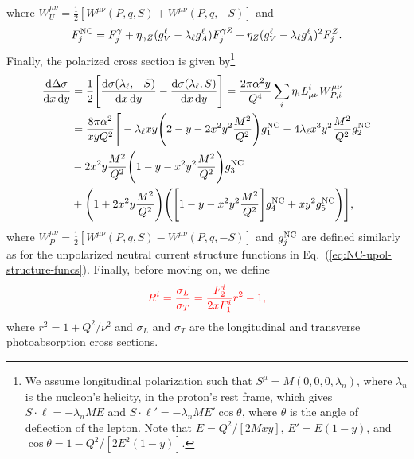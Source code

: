 \documentclass[aps,prd,amsmath,superscriptaddress,floatfix,nofootinbib]{revtex4-2}
\newcommand{\diff}[1]{{\rm d} #1}
\newcommand{\eref}[1]{Eq.~(\ref{eq:#1})}
\begin{document}
where $W^{\mu\nu}_{U} = \frac{1}{2} [ W^{\mu\nu}(P,q,S) + W^{\mu\nu}(P,q,-S) ]$ and 
\begin{eqnarray}
\label{eq:NC-upol-structure-funcs}
    F_{j}^{\rm NC} = F_{j}^{\gamma} + \eta_{\gamma Z} (g_{V}^{\ell} - \lambda_{\ell} g_{A}^{\ell}) F_{j}^{\gamma Z} + \eta_{Z} (g_{V}^{\ell} - \lambda_{\ell} g_{A}^{\ell})^2 F_{j}^{Z}
.\end{eqnarray}
Finally, the polarized cross section is given by\footnote{We assume longitudinal polarization such that $S^{\mu} = M(0,0,0,\lambda_{n})$, where $\lambda_{n}$ is the nucleon's helicity, in the proton's rest frame, which gives $S \cdot \ell = - \lambda_{n} M E$ and $S \cdot \ell' = -\lambda_{n} M E' \cos{\theta}$, where $\theta$ is the angle of deflection of the lepton. Note that $E = Q^2/[2Mxy]$, $E' = E(1-y)$, and $\cos{\theta} = 1 - Q^2/[2E^2(1-y)]$.}
\begin{eqnarray}
    \label{eq:pol-xsec}
    \begin{aligned}    
        \frac{\diff \Delta \sigma}{\diff x \, \diff y} &= \frac{1}{2} \Bigg[ \frac{\diff \sigma(\lambda_{\ell},-S)}{\diff x \, \diff y} - \frac{\diff \sigma(\lambda_{\ell},S)}{\diff x \, \diff y} \Bigg] = \frac{2 \pi \alpha^2 y}{Q^{4}} \sum_{i} \eta_{i} L_{\mu\nu}^{i} W^{\mu\nu}_{P,i} \\
        &= \frac{8 \pi \alpha^2}{x y Q^2} \Bigg[ -\lambda_{\ell} xy \Bigg( 2 - y - 2x^2y^2 \frac{M^2}{Q^2} \Bigg) g_1^{\rm NC} - 4 \lambda_{\ell} x^3 y^2 \frac{M^2}{Q^2} g_2^{\rm NC} \\
        &- 2x^2y \frac{M^2}{Q^2} \Bigg( 1 - y - x^2y^2 \frac{M^2}{Q^2} \Bigg) g_3^{\rm NC} \\
        &+ \Bigg( 1 + 2x^2y \frac{M^2}{Q^2} \Bigg) \Bigg( \Bigg[ 1 - y - x^2y^2 \frac{M^2}{Q^2} \Bigg] g_4^{\rm NC} + xy^2 g_5^{\rm NC} \Bigg) \Bigg] 
    ,\end{aligned}
\end{eqnarray}
where $W^{\mu\nu}_{P} = \frac{1}{2} [ W^{\mu\nu}(P,q,S) - W^{\mu\nu}(P,q,-S) ]$ and $g^{\rm NC}_{j}$ are defined similarly as for the unpolarized neutral current structure functions in \eref{NC-upol-structure-funcs}.
Finally, before moving on, we define
\begin{eqnarray}
    \label{eq:ratio}
    \color{red}
    R^{i} = \frac{\sigma_{L}}{\sigma_{T}} = \frac{F_{2}^{i}}{2xF_{1}^{i}} r^2 - 1
,\end{eqnarray}
where $r^2 = 1 + Q^2/\nu^2$ and $\sigma_{L}$ and $\sigma_{T}$ are the longitudinal and transverse photoabsorption cross sections.
\end{document}
